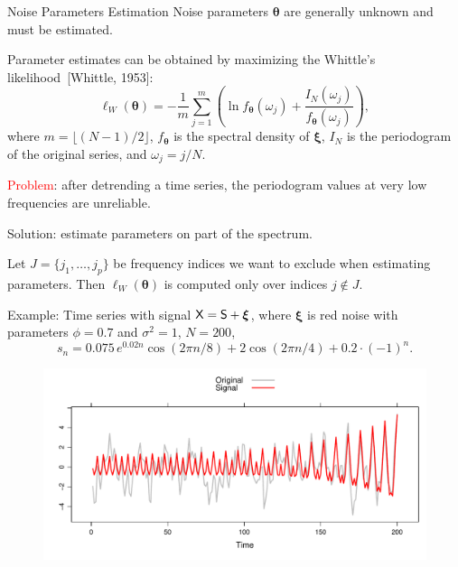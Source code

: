 \documentclass[notheorems, handout]{beamer}
\newcommand{\bluetext}[1]{{\usebeamercolor[fg]{bluetext_color}#1}}
\begin{document}
\begin{frame}{Noise Parameters Estimation}
	Noise parameters $\bm\theta$ are generally unknown and must be estimated.\medskip

	Parameter estimates can be obtained by maximizing the Whittle's likelihood~[Whittle, 1953]:
	$$
		\ell_W(\bm\theta)=-\frac{1}{m}\sum_{j=1}^m\left(\ln f_{\bm\theta}(\omega_j)+\frac{I_N(\omega_j)}{f_{\bm\theta}(\omega_j)}\right),
	$$
	where $m=\lfloor (N-1)/2\rfloor$, $f_{\bm\theta}$ is the spectral density of $\bm\xi$, $I_N$ is the periodogram of the original series, and $\omega_j=j/N$.\medskip

	\textcolor{red}{Problem}: after detrending a time series, the periodogram values at very low frequencies are unreliable.\medskip

	\bluetext{Solution}: estimate parameters on part of the spectrum.
	
	Let $J=\{j_1, \ldots, j_p\}$ be frequency indices we want to exclude when estimating parameters. Then $\ell_W(\bm\theta)$ is computed only over indices $j\not\in J$.
\end{frame}

\begin{frame}{Example: Time series with signal}
	$\mathsf{X}=\mathsf{S}+\boldsymbol{\xi}$, where $\boldsymbol{\xi}$ is red noise with parameters $\phi=0.7$ and $\sigma^2=1$, $N=200$,
	$$
		s_n=0.075\,e^{0.02n}\cos(2\pi n / 8) + 2\cos(2\pi n / 4) + 0.2\cdot (-1)^n.
	$$
	\begin{figure}
		\centering
		\includegraphics[width=\textwidth]{img/noise_ts_signal.pdf}
	\end{figure}
\end{frame}
\end{document}
